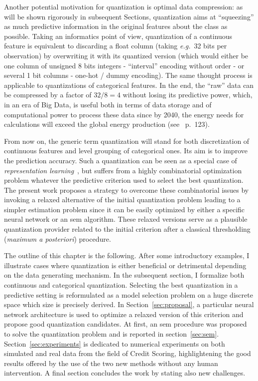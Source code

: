 Another potential motivation for quantization is optimal data compression: as will be shown rigorously in subsequent Sections, quantization aims at ``squeezing'' as much predictive information in the original features about the class as possible. Taking an informatics point of view, quantization of a continuous feature is equivalent to discarding a float column (taking \textit{e.g.}\ 32 bits per observation) by overwriting it with its quantized version (which would either be one column of unsigned 8 bits integers - ``interval'' encoding without order - or several 1 bit columns - one-hot / dummy encoding). The same thought process is applicable to quantizations of categorical features. In the end, the ``raw'' data can be compressed by a factor of $32 / 8 = 4$ without losing its predictive power, which, in an era of Big Data, is useful both in terms of data storage and of computational power to process these data since by 2040, the energy needs for calculations will exceed the global energy production (see~\cite{villani2018donner} p.\ 123).

From now on, the generic term quantization will stand for both discretization of continuous features and level grouping of categorical ones. Its aim is to improve the prediction accuracy. Such a quantization can be seen as a special case of \textit{representation learning}~\cite{bengio2013representation}, but suffers from a highly combinatorial optimization problem whatever the predictive criterion used to select the best quantization. The present work proposes a strategy to overcome these combinatorial issues by invoking a relaxed alternative of the initial quantization problem leading to a simpler estimation problem since it can be easily optimized by either a specific neural network or an \gls{sem} algorithm. These relaxed versions serve as a plausible quantization provider related to the initial criterion after a classical thresholding (\textit{maximum a posteriori}) procedure.

The outline of this chapter is the following. After some introductory examples, I illustrate cases where quantization is either beneficial or detrimental depending on the data generating mechanism. In the subsequent section, I formalize both continuous and categorical quantization. Selecting the best quantization in a predictive setting is reformulated as a model selection problem on a huge discrete space which size is precisely derived. In Section~\ref{sec:proposal}, a particular neural network architecture is used to optimize a relaxed version of this criterion and propose good quantization candidates. At first, an \gls{sem} procedure was proposed to solve the quantization problem and is reported in section~\ref{sec:sem}. Section~\ref{sec:experiments} is dedicated to numerical experiments on both simulated and real data from the field of Credit Scoring, highlightening the good results offered by the use of the two new methods without any human intervention. A final section concludes the work by stating also new challenges.


